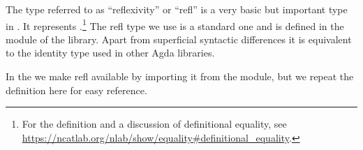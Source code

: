 The type referred to as ``reflexivity'' or ``refl'' is a very basic but important
type in \mltt. It represents .\footnote{For the definition and a discussion of definitional equality, see\\\url{https://ncatlab.org/nlab/show/equality\#definitional\_equality}.}
The refl type we use is a standard one and is defined in the  module of the \typetopology library. Apart from superficial syntactic differences it is equivalent to the identity type used in other Agda libraries.

In the \ualib we make refl available by importing it from the  module, but we repeat the definition here for easy reference.
\ccpad
\begin{code}%
\>[1]\AgdaSpace{}%
\AgdaSpace{}%
\AgdaSymbol{\{}\AgdaSymbol{\}}\AgdaSpace{}%
\AgdaSymbol{\{}\AgdaSpace{}%
\AgdaSymbol{:}\AgdaSpace{}%
\AgdaSpace{}%
\AgdaSpace{}%
\AgdaSymbol{\}}\AgdaSpace{}%
\AgdaSymbol{:}\AgdaSpace{}%
\AgdaSpace{}%
\AgdaSpace{}%
\AgdaSpace{}%
\AgdaSpace{}%
\AgdaSpace{}%
\AgdaSpace{}%
\AgdaSpace{}%
\AgdaSpace{}%
\AgdaSymbol{:}\AgdaSpace{}%
\AgdaSymbol{\{}\AgdaSpace{}%
\AgdaSymbol{:}\AgdaSpace{}%
\AgdaSymbol{\}}\AgdaSpace{}%
\AgdaSpace{}%
\AgdaSpace{}%
\AgdaSpace{}%
\<%
\end{code}

